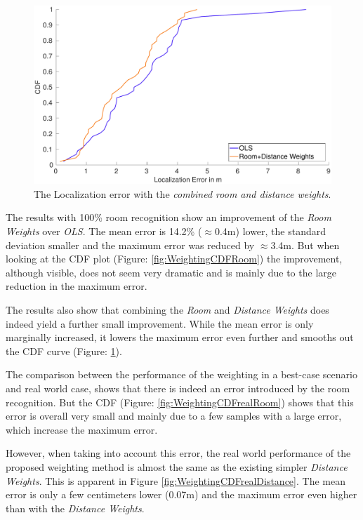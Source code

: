\begin{figure}[p]
\centering
\includegraphics[width=\textwidth]{Figures/WeightingCDF_RDW}
\decoRule
\caption[CDF Room+Distance Weights method (best-case)]{The Localization error with the \emph{combined room and distance weights}.}
\label{fig:WeightingCDFRoomDistance}
\end{figure}

The results with 100\% room recognition show an improvement of the \emph{Room Weights} over \emph{OLS}. The mean error is 14.2\% ($\approx$0.4m) lower, the standard deviation smaller and the maximum error was reduced by $\approx$3.4m. But when looking at the CDF plot (Figure: \ref{fig:WeightingCDFRoom}) the improvement, although visible, does not seem very dramatic and is mainly due to the large reduction in the maximum error.

The results also show that combining the \emph{Room} and \emph{Distance Weights} does indeed yield a further small improvement. While the mean error is only marginally increased, it lowers the maximum error even further and smooths out the CDF curve (Figure: \ref{fig:WeightingCDFRoomDistance}).

The comparison between the performance of the weighting in a best-case scenario and real world case, shows that there is indeed an error introduced by the room recognition. But the CDF (Figure: \ref{fig:WeightingCDFrealRoom}) shows that this error is overall very small and mainly due to a few samples with a large error, which increase the maximum error.

However, when taking into account this error, the real world performance of the proposed weighting method is almost the same as the existing simpler \emph{Distance Weights}. This is apparent in Figure \ref{fig:WeightingCDFrealDistance}. The mean error is only a few centimeters lower (0.07m) and the maximum error even higher than with the \emph{Distance Weights}.

